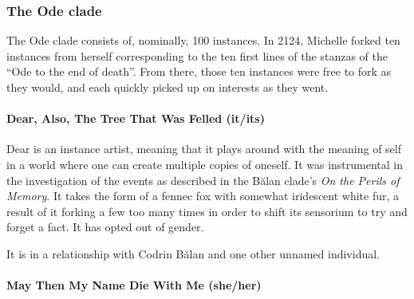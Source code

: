 
\subsubsection{The Ode clade}

The Ode clade consists of, nominally, 100 instances. In 2124, Michelle forked ten instances from herself corresponding to the ten first lines of the stanzas of the ``Ode to the end of death''. From there, those ten instances were free to fork as they would, and each quickly picked up on interests as they went.

\paragraph{Dear, Also, The Tree That Was Felled (it/its)}

Dear is an instance artist, meaning that it plays around with the meaning of self in a world where one can create multiple copies of oneself. It was instrumental in the investigation of the events as described in the Bălan clade's \emph{On the Perils of Memory}. It takes the form of a fennec fox with somewhat iridescent white fur, a result of it forking a few too many times in order to shift its sensorium to try and forget a fact. It has opted out of gender.

It is in a relationship with Codrin Bălan and one other unnamed individual.

\begin{comment}
\emph{Appears in:}

\begin{itemize}
\tightlist
\item
  \href{https://qoheleth.post-self.ink}{\emph{Qoheleth} and ``Gallery Exhibition: A Love Story''}
\item
  \href{https://toledot.post-self.ink}{\emph{Toledot}}
\item
  \href{https://neviim.post-self.ink}{\emph{Nevi'im}}
\item
  \href{https://mitzvot.post-self.ink}{\emph{Mitzvot}}
\item
  ``Selected Letters'' (mentioned)
\end{itemize}
\end{comment}

\paragraph{May Then My Name Die With Me (she/her)}

